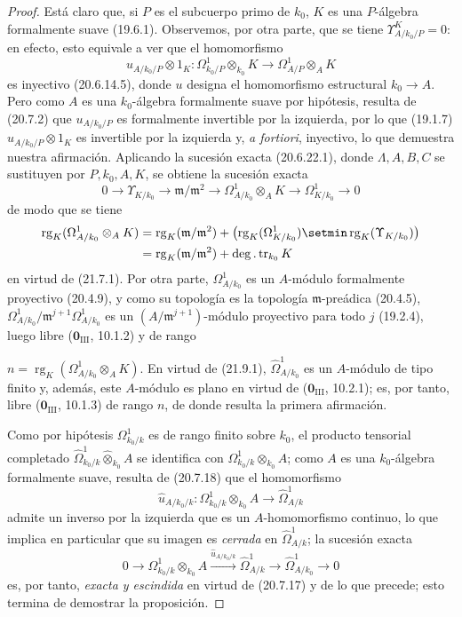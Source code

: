 \begin{proof}
Está claro que, si $P$ es el subcuerpo primo de $k_0$, $K$ es una
$P$-álgebra formalmente suave (19.6.1). Observemos, por otra parte, que se tiene
$\Upsilon^K_{A/k_0/P}=0$: en efecto, esto equivale a ver que el homomorfismo
\[
  u_{A/k_0/P}\otimes1_K:
  \Omega^1_{k_0/P}\otimes_{k_0}K
  \longrightarrow \Omega^1_{A/P}\otimes_A K
\]
es inyectivo (20.6.14.5), donde $u$ designa el homomorfismo estructural
$k_0\to A$. Pero como $A$ es una $k_0$-álgebra formalmente suave por hipótesis,
resulta de (20.7.2) que $u_{A/k_0/P}$ es formalmente invertible por la
izquierda, por lo que (19.1.7) $u_{A/k_0/P}\otimes1_K$ es invertible por la
izquierda y, \emph{a fortiori}, inyectivo, lo que demuestra nuestra afirmación.
Aplicando la sucesión exacta (20.6.22.1), donde $\Lambda,A,B,C$ se sustituyen
por $P,k_0,A,K$, se obtiene la sucesión exacta
\[
  0\longrightarrow \Upsilon_{K/k_0}
  \longrightarrow \mathfrak m/\mathfrak m^2
  \longrightarrow \Omega^1_{A/k_0}\otimes_A K
  \longrightarrow \Omega^1_{K/k_0}\longrightarrow0
\]
de modo que se tiene
\[
\begin{split}
  \operatorname{rg}_K(\Omega^1_{A/k_0}\otimes_AK)
  &={\operatorname{rg}}_K(\mathfrak m/\mathfrak m^2)
    +\bigl(\operatorname{rg}_K(\Omega^1_{K/k_0})
    \setmin\operatorname{rg}_K(\Upsilon_{K/k_0})\bigr)\\
  &={\operatorname{rg}}_K(\mathfrak m/\mathfrak m^2)
    +\deg.\operatorname{tr}_{k_0}K
\end{split}
\]
en virtud de (21.7.1). Por otra parte, $\Omega^1_{A/k_0}$ es un
$A$-módulo formalmente proyectivo (20.4.9), y como su topología es la topología
$\mathfrak m$-preádica (20.4.5),
$\Omega^1_{A/k_0}/\mathfrak m^{j+1}\Omega^1_{A/k_0}$ es un
$(A/\mathfrak m^{j+1})$-módulo proyectivo para todo $j$ (19.2.4), luego libre
($\mathbf 0_{\mathrm{III}}$, 10.1.2) y de rango

$n=\operatorname{rg}_K(\Omega^1_{A/k_0}\otimes_AK)$. En virtud de (21.9.1),
$\widehat\Omega^1_{A/k_0}$ es un $A$-módulo de tipo finito y, además, este
$A$-módulo es plano en virtud de ($\mathbf 0_{\mathrm{III}}$, 10.2.1); es,
por tanto, libre ($\mathbf 0_{\mathrm{III}}$, 10.1.3) de rango $n$, de donde
resulta la primera afirmación.

Como por hipótesis $\Omega^1_{k_0/k}$ es de rango finito sobre $k_0$, el
producto tensorial completado
$\widehat\Omega^1_{k_0/k}\widehat\otimes_{k_0}A$ se identifica con
$\Omega^1_{k_0/k}\otimes_{k_0}A$; como $A$ es una $k_0$-álgebra formalmente
suave, resulta de (20.7.18) que el homomorfismo
\[
  \widehat u_{A/k_0/k}:
  \Omega^1_{k_0/k}\otimes_{k_0}A
  \longrightarrow\widehat\Omega^1_{A/k}
\]
admite un inverso por la izquierda que es un $A$-homomorfismo continuo, lo que
implica en particular que su imagen es \emph{cerrada} en
$\widehat\Omega^1_{A/k}$; la sucesión exacta
\[
  0\longrightarrow \Omega^1_{k_0/k}\otimes_{k_0}A
  \xrightarrow{\widehat u_{A/k_0/k}}\widehat\Omega^1_{A/k}
  \longrightarrow\widehat\Omega^1_{A/k_0}\longrightarrow0
\]
es, por tanto, \emph{exacta y escindida} en virtud de (20.7.17) y de lo que precede;
esto termina de demostrar la proposición.
\end{proof}

